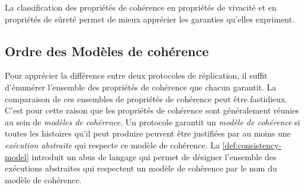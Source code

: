 

La classification des propriétés de cohérence en propriétés de vivacité et en propriétés de sûreté permet de mieux apprécier les garanties qu'elles expriment.

\subsection{Ordre des Modèles de cohérence}\label{subsec:consistency-spec-hier}

Pour apprécier la différence entre deux protocoles de réplication, il suffit d'énumérer l'ensemble des propriétés de cohérence que chacun garantit.
La comparaison de ces ensembles de propriétés de cohérence peut être fastidieux.
C'est pour cette raison que les propriétés de cohérence sont généralement réunies au sein de \emph{modèles de cohérence}.
Un protocole garantit un \emph{modèle de cohérence} si toutes les histoires qu'il peut produire peuvent être justifiées par au moins une \emph{exécution abstraite} qui respecte ce modèle de cohérence.
La \autoref{def:consistency-model} introduit un abus de langage qui permet de désigner l'ensemble des exécutions abstraites qui respectent un modèle de cohérence par le nom du modèle de cohérence.

